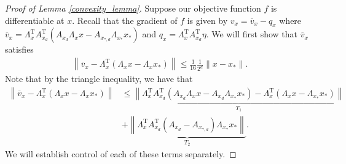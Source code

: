 \documentclass[11pt]{article}
\renewcommand{\top}{{\mathrm{T}}}
\theoremstyle{remark}
\begin{document}
\begin{proof}[Proof of Lemma \ref{convexity_lemma}]

Suppose our objective function $f$ is differentiable at $x$. Recall that the gradient of $f$ is given by $v_x = \overline{v}_x - q_x$ where
    $\overline{v}_x = \Lambda_x^\top A_{x_d}^\top (A_{x_d}\Lambda_x x - A_{x_{*,d}}\Lambda_{x_*}x_*)$ and $q_x = \Lambda_x^\top A_{x_d}^\top \eta$. We will first show that $\overline{v}_x$ satisfies \begin{align*}
    \left\| \overline{v}_x - \Lambda_x^\top (\Lambda_xx - \Lambda_xx_*) \right\| \leqslant \frac{1}{16}\frac{1}{2^d}\|x-x_*\|.
\end{align*} Note that by the triangle inequality, we have that \begin{align*}
    \left\|\overline{v}_x - \Lambda_x^\top (\Lambda_xx - \Lambda_xx_*)\right\| & \leqslant \underbrace{\left\|\Lambda_x^\top A_{x_d}^\top (A_{x_d}\Lambda_x x - A_{x_{d}}\Lambda_{x_*}x_*) - \Lambda_x^\top(\Lambda_x x - \Lambda_{x_*} x_*)\right\|}_{T_1} \\
    & + \underbrace{\left\|\Lambda_x^\top A_{x_d}^\top(A_{x_d} - A_{x_{*,d}})\Lambda_{x_*}x_*\right\|}_{T_2}.
\end{align*} We will establish control of each of these terms separately.


\end{proof}
\end{document}
